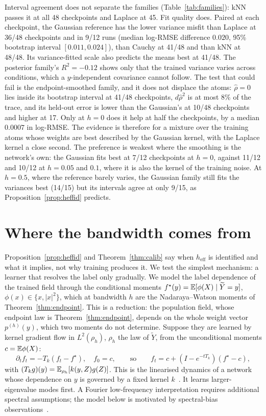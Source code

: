 \documentclass{article}
\theoremstyle{plain}
\theoremstyle{remark}
\begin{document}
Interval agreement does not separate the families (Table~\ref{tab:families}): kNN passes
it at all 48 checkpoints and Laplace at 45. Fit quality does. Paired at each checkpoint,
the Gaussian reference has the lower variance misfit than Laplace at 36/48 checkpoints
and in 9/12 runs (median log-RMSE difference $0.020$, 95\% bootstrap interval $[0.011,
0.024]$), than Cauchy at 41/48 and than kNN at 48/48. Its variance-fitted scale also
predicts the means best at 41/48. The posterior family's $R^2=-0.12$ shows only that
the trained variance varies across conditions, which a $y$-independent covariance cannot
follow. The test that could fail is the endpoint-smoothed family, and it does not
displace the atoms: $\hat\rho=0$ lies inside its bootstrap interval at 41/48 checkpoints,
$d\hat\rho^2$ is at most $8\%$ of the trace, and its held-out error is lower than the
Gaussian's at 10/48 checkpoints and higher at 17. Only at $h{=}0$ does it help at half
the checkpoints, by a median $0.0007$ in log-RMSE. The evidence is therefore for a
mixture over the training atoms whose weights are best described by the Gaussian
kernel, with the Laplace kernel a close second. The preference is weakest where the
smoothing is the network's own: the Gaussian fits best at 7/12 checkpoints at $h{=}0$,
against 11/12 and 10/12 at $h=0.05$ and $0.1$, where it is also the kernel of the
training noise. At $h{=}0.5$, where the reference barely
varies, the Gaussian family still fits the variances best (14/15) but its intervals agree
at only 9/15, as Proposition~\ref{prop:heffid} predicts.

\section{Where the bandwidth comes from}
\label{app:specbias}


Proposition~\ref{prop:heffid} and Theorem~\ref{thm:calib} say when $h_{\mathrm{eff}}$ is
identified and what it implies, not why training produces it. We test the simplest
mechanism: a learner that resolves the label only gradually. We model the label
dependence of the trained field through the conditional moments
$f^\star(y)=\mathbb{E}[\phi(X)\mid\widetilde Y=y]$, $\phi(x)\in\{x,|x|^2\}$, which at bandwidth $h$
are the Nadaraya--Watson moments of Theorem~\ref{thm:endpoint}. This is a reduction: the
population field, whose endpoint law is Theorem~\ref{thm:endpoint}, depends on the whole weight vector
$p^{(h)}(y)$, which two moments do not determine. Suppose they are learned by kernel gradient flow in
$L^2(\rho_h)$, $\rho_h$ the law of $\widetilde Y$, from the unconditional moments
$c=\mathbb{E}\phi(X)$:
\begin{equation}
\partial_tf_t=-T_k(f_t-f^\star),\quad f_0=c,
\qquad\text{so}\qquad
f_t=c+(I-e^{-tT_k})(f^\star-c),
\label{eq:kgf}
\end{equation}
with $(T_kg)(y)=\mathbb{E}_{\rho_h}[k(y,Z)g(Z)]$. This is
the linearised dynamics of a network whose dependence on $y$ is governed by a fixed kernel $k$~\citep{jacot2018neural}. It learns larger-eigenvalue modes first. A Fourier low-frequency interpretation requires additional spectral assumptions; the model below is motivated by spectral-bias observations~\citep{rahaman2019spectral}.
\end{document}

